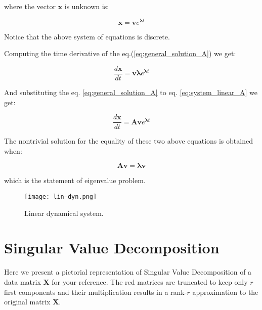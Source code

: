 \documentclass[10pt,twocolumn]{article}
\begin{document}
where the vector $\mathbf{x}$ is unknown is:

\begin{equation} \label{eq:general_solution_A}
\mathbf{x} = \mathbf{v} e^{\bm{\lambda} t}
\end{equation}

Notice that the above system of equations is discrete.

Computing the time derivative of the eq.(\ref{eq:general_solution_A}) we get:

\begin{equation} \label{eq:sub1}
\frac{d \mathbf{x}}{dt} = \mathbf{v} \bm{\lambda} e^{\bm{\lambda} t}
\end{equation}

And substituting the eq. \ref{eq:general_solution_A} to eq. \ref{eq:system_linear_A} we get:

\begin{equation} \label{eq:sub2}
\frac{d \mathbf{x}}{dt} = \mathbf{A} \mathbf{v} e^{\bm{\lambda} t}
\end{equation}

The nontrivial solution for the equality of these two above equations is obtained when:

\begin{equation} \label{eq:eigval}
\mathbf{A} \mathbf{v} = \bm{\lambda} \mathbf{v} 
\end{equation}

which is the statement of eigenvalue problem.



\begin{figure}[H]
\centering\texttt{[image: lin-dyn.png]}
\caption{Linear dynamical system.}
\label{fig:linear_system}
\end{figure}


\newpage

\section{Singular Value Decomposition} \label{app:C}

Here we present a pictorial representation of Singular Value Decomposition of a data matrix $\mathbf{X}$ for your reference. The red matrices are truncated to keep only $r$ first components and their multiplication results in a rank-$r$ approximation to the original matrix $\mathbf{X}$.
\end{document}
